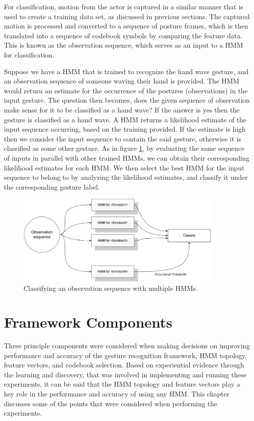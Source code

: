 \documentclass[]{report}   %
\begin{document}
For classification, motion from the actor is captured in a similar manner that is used to create a training data set, as discussed in previous sections. The captured motion is processed and converted to a sequence of posture frames, which is then translated into a sequence of codebook symbols by comparing the feature data. This is known as the observation sequence, which serves as an input to a HMM for classification. 

Suppose we have a HMM that is trained to recognize the hand wave gesture, and an observation sequence of someone waving their hand is provided. The HMM would return an estimate for the occurrence of the postures (observations) in the input gesture. The question then becomes, does the given sequence of observation make sense for it to be classified as a hand wave? If the answer is yes then the gesture is classified as a hand wave. A HMM returns a likelihood estimate of the input sequence occurring\cite{1165342}, based on the training provided. If the estimate is high then we consider the input sequence to contain the said gesture, otherwise it is classified as some other gesture. As in figure \ref{fig:fw3}, by evaluating the same sequence of inputs in parallel with other trained HMMs, we can obtain their corresponding likelihood estimates for each HMM. We then select the best HMM for the input sequence to belong to by analyzing the likelihood estimates, and classify it under the corresponding gesture label.

\begin{figure}[htbp]
	\centering
		\includegraphics[width=0.90\textwidth]{fw3.pdf}
	\caption{Classifying an observation sequence with multiple HMMs.}
	\label{fig:fw3}
\end{figure}

\chapter{Framework Components}\label{sec:fwc}
Three principle components were considered when making decisions on improving performance and accuracy of the gesture recognition framework, HMM topology, feature vectors, and codebook selection. Based on experiential evidence through the learning and discovery, that was involved in implementing and running these experiments, it can be said that the HMM topology and feature vectors play a key role in the performance and accuracy of using any HMM. This chapter discusses some of the points that were considered when performing the experiments.
\end{document}
